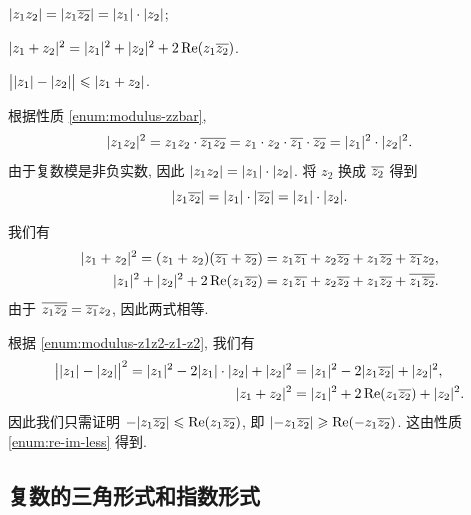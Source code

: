 \begin{exampleenum}[证明:]
  \item $\lvert z_1z_2\rvert=\lvert z_1\overline{z_2}\rvert=\lvert z_1\rvert\cdot\lvert z_2\rvert$;
  \label{enum:modulus-z1z2-z1-z2}
  \item $\lvert z_1+z_2\rvert^2=\lvert z_1\rvert^2+\lvert z_2\rvert^2+2\operatorname{Re}(z_1\overline{z_2})$.
  \item $\bigl\vert\lvert z_1\rvert-\lvert z_2\rvert\bigr\vert\leqslant\lvert z_1+z_2\rvert$.
\end{exampleenum}


\begin{proofenumr}
  \item 根据性质 \ref{enum:modulus-zzbar},
  \[
      \lvert z_1z_2\rvert^2=z_1z_2\cdot\overline{z_1}\overline{z_2}
    =z_1\cdot z_2\cdot \overline{z_1}\cdot \overline{z_2}
    =\lvert z_1\rvert^2\cdot\lvert z_2\rvert^2.
  \]
  由于复数模是非负实数, 因此 $\lvert z_1z_2\rvert=\lvert z_1\rvert\cdot\lvert z_2\rvert$.
  将 $z_2$ 换成 $\overline{z_2}$ 得到
  \[
      \lvert z_1\overline{z_2}\rvert
    =\lvert z_1\rvert\cdot\lvert\overline{z_2}\rvert
    =\lvert z_1\rvert\cdot\lvert z_2\rvert.
  \]
  \item 我们有
  \begin{align*}
      \lvert z_1+z_2\rvert^2
    =(z_1+z_2)(\overline{z_1}+\overline{z_2})&
    =z_1\overline{z_1}+z_2\overline{z_2}+z_1\overline{z_2}+\overline{z_1}z_2,\\
      \lvert z_1\rvert^2+\lvert z_2\rvert^2+2\operatorname{Re}(z_1\overline{z_2})&
    =z_1\overline{z_1}+z_2\overline{z_2}+z_1\overline{z_2}+\overline{z_1\overline{z_2}}.
  \end{align*}
  由于 $\overline{z_1\overline{z_2}}=\overline{z_1}z_2$, 因此两式相等.
  \item 根据 \ref{enum:modulus-z1z2-z1-z2}, 我们有
  \begin{align*}
      \bigl\vert\lvert z_1\rvert-\lvert z_2\rvert\bigr\vert^2
    =\lvert z_1\rvert^2-2\lvert z_1\rvert\cdot\lvert z_2\rvert+\lvert z_2\rvert^2&
    =\lvert z_1\rvert^2-2\lvert z_1 \overline{z_2}\rvert+\lvert z_2\rvert^2,\\
      \lvert z_1+z_2\rvert^2&
    =\lvert z_1\rvert^2+2\operatorname{Re}(z_1 \overline{z_2})+\lvert z_2\rvert^2.
  \end{align*}
  因此我们只需证明 $-\lvert z_1 \overline{z_2}\rvert\leqslant \operatorname{Re}(z_1 \overline{z_2})$, 即 $\lvert-z_1 \overline{z_2}\rvert\geqslant \operatorname{Re}(-z_1 \overline{z_2})$.
  这由性质 \ref{enum:re-im-less} 得到.
  \qedhere
\end{proofenumr}


\subsection{复数的三角形式和指数形式}

